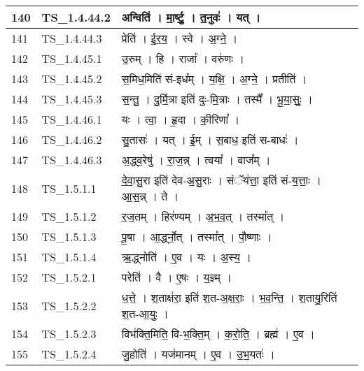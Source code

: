 \documentclass[17pt]{extarticle}
\begin{document}
\begin{longtable}{||p{0.4in}||p{0.9in}||p{4.0in}||p{0.9in}||}
            140 & TS\_1.4.44.2 & अन्विति॑   ।   मा॒र्ष्टु॒   ।   त॒नुवः॑   ।   यत्   ।    &      \\
        \hline
            141 & TS\_1.4.44.3 & प्रेति॑   ।   ई॒र॒य॒   ।   स्वे   ।   अ॒ग्ने॒   ।    &      \\
        \hline
            142 & TS\_1.4.45.1 & उ॒रुम्   ।   हि   ।   राजा᳚   ।   वरु॑णः   ।    &      \\
        \hline
            143 & TS\_1.4.45.2 & स॒मिध॒मिति॑ सं{-}इध᳚म्   ।   य॒क्षि॒   ।   अ॒ग्ने॒   ।   प्रतीति॑   ।    &      \\
        \hline
            144 & TS\_1.4.45.3 & स॒न्तु॒   ।   दु॒र्मि॒त्रा इति॑ दुः{-}मि॒त्राः   ।   तस्मै᳚   ।   भू॒या॒सुः॒   ।    &      \\
        \hline
            145 & TS\_1.4.46.1 & यः   ।   त्वा॒   ।   हृ॒दा   ।   की॒रिणा᳚   ।    &      \\
        \hline
            146 & TS\_1.4.46.2 & सु॒तासः॑   ।   यत्   ।   ई॒म्   ।   स॒बाध॒ इति॑ स{-}बाधः॑   ।    &      \\
        \hline
            147 & TS\_1.4.46.3 & अ॒द्ध्व॒रेषु॑   ।   रा॒ज॒न्न्   ।   त्वया᳚   ।   वाज᳚म्   ।    &      \\
        \hline
            148 & TS\_1.5.1.1 & दे॒वा॒सु॒रा इति॑ देव{-}अ॒सु॒राः   ।   संॅय॑त्ता॒ इति॑ सं{-}य॒त्ताः॒   ।   आ॒स॒न्न्   ।   ते   ।    &      \\
        \hline
            149 & TS\_1.5.1.2 & र॒ज॒तम्   ।   हिर॑ण्यम्   ।   अ॒भ॒व॒त्   ।   तस्मा᳚त्   ।    &      \\
        \hline
            150 & TS\_1.5.1.3 & पू॒षा   ।   आ॒र्द्ध्नो॒त्   ।   तस्मा᳚त्   ।   पौ॒ष्णाः   ।    &      \\
        \hline
            151 & TS\_1.5.1.4 & ऋ॒द्ध्नोति॑   ।   ए॒व   ।   यः   ।   अ॒स्य॒   ।    &      \\
        \hline
            152 & TS\_1.5.2.1 & परेति॑   ।   वै   ।   ए॒षः   ।   य॒ज्ञ्म्   ।    &      \\
        \hline
            153 & TS\_1.5.2.2 & ध॒त्ते॒   ।   श॒ताक्ष॑रा॒ इति॑ श॒त{-}अ॒क्ष॒राः॒   ।   भ॒व॒न्ति॒   ।   श॒तायु॒रिति॑ श॒त{-}आ॒युः॒   ।    &      \\
        \hline
            154 & TS\_1.5.2.3 & विभ॑क्ति॒मिति॒ वि{-}भ॒क्ति॒म्   ।   क॒रो॒ति॒   ।   ब्रह्म॑   ।   ए॒व   ।    &      \\
        \hline
            155 & TS\_1.5.2.4 & जु॒होति॑   ।   यज॑मानम्   ।   ए॒व   ।   उ॒भ॒यतः॑   ।    &      \\
        \hline

\end{longtable}
\end{document}
